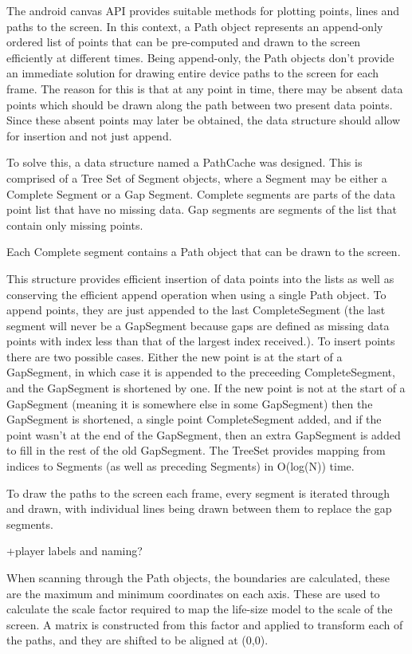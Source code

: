 The android canvas API provides suitable methods for plotting points, lines and paths to the screen. In this context, a Path object represents an append-only ordered list of points that can be pre-computed and drawn to the screen efficiently at different times.
Being append-only, the Path objects don't provide an immediate solution for drawing entire device paths to the screen for each frame. The reason for this is that at any point in time, there may be absent data points which should be drawn along the path between two present data points. Since these absent points may later be obtained, the data structure should allow for insertion and not just append.

To solve this, a data structure named a PathCache was designed. This is comprised of a Tree Set of Segment objects, where a Segment may be either a Complete Segment or a Gap Segment. Complete segments are parts of the data point list that have no missing data. Gap segments are segments of the list that contain only missing points.

Each Complete segment contains a Path object that can be drawn to the screen.

This structure provides efficient insertion of data points into the lists as well as conserving the efficient append operation when using a single Path object. To append points, they are just appended to the last CompleteSegment (the last segment will never be a GapSegment because gaps are defined as missing data points with index less than that of the largest index received.). To insert points there are two possible cases. Either the new point is at the start of a GapSegment, in which case it is appended to the preceeding CompleteSegment, and the GapSegment is shortened by one. If the new point is not at the start of a GapSegment (meaning it is somewhere else in some GapSegment) then the GapSegment is shortened, a single point CompleteSegment added, and if the point wasn't at the end of the GapSegment, then an extra GapSegment is added to fill in the rest of the old GapSegment. The TreeSet provides mapping from indices to Segments (as well as preceding Segments) in O(log(N)) time.

To draw the paths to the screen each frame, every segment is iterated through and drawn, with individual lines being drawn between them to replace the gap segments.

+player labels and naming?

When scanning through the Path objects, the boundaries are calculated, these are the maximum and minimum coordinates on each axis. These are used to calculate the scale factor required to map the life-size model to the scale of the screen. A matrix is constructed from this factor and applied to transform each of the paths, and they are shifted to be aligned at (0,0).

